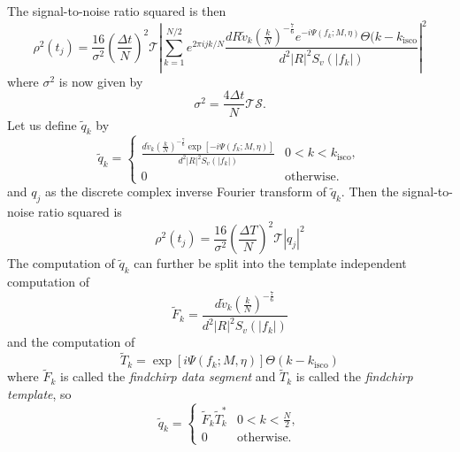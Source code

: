 The signal-to-noise ratio squared is then
\begin{equation}
\rho^2(t_j) = 
\frac{16}{\sigma^2}\left(\frac{\Delta t}{N}\right)^2 \mathcal{T}
\left| 
  \sum_{k=1}^{N/2} e^{2\pi ijk/N} 
  \frac{dR\tilde{v}_k \left(\frac{k}{N}\right)^{-\frac{7}{6}} e^{-i\Psi(f_k;M,\eta)}\Theta(k-k_\mathrm{isco}}
       {d^2|R|^2 S_v\left(\left|f_k\right|\right)}
\right|^2 
\label{eq:signaltonoisesq}
\end{equation}
where $\sigma^2$ is now given by
\begin{equation}
\sigma^2 = \frac{4\Delta t}{N} \mathcal{T}\mathcal{S}.
\label{eq:sigmasqts}
\end{equation}
Let us define $\tilde{q}_k$ by
\begin{equation}
\label{eq:qtildedef}
\tilde{q}_k = 
\begin{cases}
\frac{d\tilde{v}_k \left(\frac{k}{N}\right)^{-\frac{7}{6}} \exp\left[-i\Psi(f_k;M,\eta)\right]}
     {d^2|R|^2S_v\left(\left|f_k\right|\right)} & 0 < k < k_\mathrm{isco}, \\
0 & \text{otherwise}.
\end{cases}
\end{equation}
and $q_j$ as the discrete complex inverse Fourier transform of $\tilde{q}_k$. Then
the signal-to-noise ratio squared is
\begin{equation}
\rho^2(t_j) = \frac{16}{\sigma^2}\left(\frac{\Delta T}{N}\right)^2 \mathcal{T}
\left|q_j\right|^2
\end{equation}
The computation of $\tilde{q}_k$ can further be split into the template
independent computation of
\begin{equation}
\tilde{F}_k = \frac{d\tilde{v}_k \left(\frac{k}{N}\right)^{-\frac{7}{6}}}
{d^2|R|^2S_v\left(\left|f_k\right|\right)}
\end{equation}
and the computation of
\begin{equation}
\tilde{T}_k = \exp\left[i\Psi(f_k;M,\eta)\right] \Theta\left(k-k_\mathrm{isco}\right)
\end{equation}
where $\tilde{F}_k$ is called the \emph{findchirp data segment} and 
$\tilde{T}_k$ is called the \emph{findchirp template}, so
\begin{equation}
\tilde{q}_k = 
\begin{cases}
\tilde{F}_k \tilde{T}_k^\ast & 0 < k < \frac{N}{2},\\
0 & \text{otherwise}.
\end{cases}
\end{equation}

